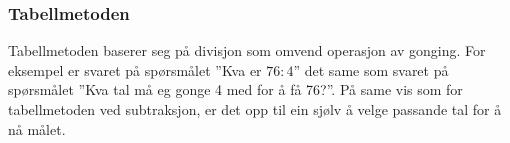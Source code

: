 \subsubsection{Tabellmetoden}
Tabellmetoden baserer seg på divisjon som omvend operasjon av gonging. For eksempel er svaret på spørsmålet ''Kva er $ {76:4} $'' det same som svaret på spørsmålet ''Kva tal må eg gonge 4 med for å få 76?''. På same vis som for tabellmetoden ved subtraksjon, er det opp til ein sjølv å velge passande tal for å nå målet.
\begin{center}
	\parbox{0.35\linewidth}{
		} \qquad
\parbox{0.35\linewidth}{
	} \vsk

\parbox{0.415\linewidth}{
}
\end{center}
\newpage
